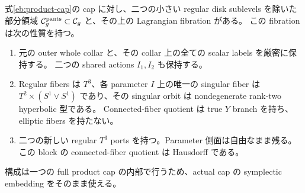 \begin{theorem}\label{eb:pants}
式\eqref{eb:product-cap}の cap に対し、二つの小さい regular disk sublevels を除いた部分領域
$\mathcal C_g^{\rm pants}\subset\mathcal C_g$ と、その上の Lagrangian fibration がある。
この fibration は次の性質を持つ。
\begin{enumerate}
\item 元の outer whole collar と、その collar 上の全ての scalar labels を厳密に保持する。
二つの shared actions $I_1,I_2$ も保持する。
\item Regular fibers は $T^3$、各 parameter $I$ 上の唯一の singular fiber は
$T^2\times(S^1\vee S^1)$ であり、その singular orbit は nondegenerate rank-two hyperbolic 型である。
Connected-fiber quotient は true $Y$ branch を持ち、elliptic fibers を持たない。
\item 二つの新しい regular $T^3$ ports を持つ。Parameter 側面は自由なまま残る。
この block の connected-fiber quotient は Hausdorff である。
\end{enumerate}
構成は一つの full product cap の内部で行うため、actual cap の symplectic embedding をそのまま使える。
\end{theorem}

